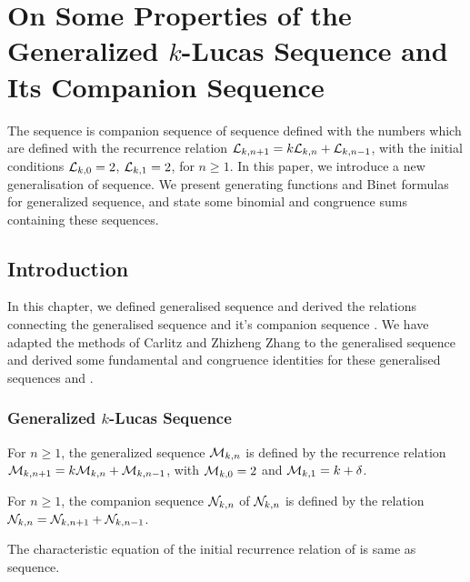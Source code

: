 %
%
\let\textcircled=\pgftextcircled
\chapter{On Some Properties of the Generalized $k$-Lucas Sequence and Its Companion Sequence}
\label{chap:ON SOME NEW IDENTITIES CONCERNING THE GENERALIZED}
The \kL\vspace{.5mm} sequence is companion sequence of \kF\vspace{.5mm} sequence defined with the \kL\vspace{.5mm} numbers which are defined with the recurrence relation $\mathcal{L}_{k,n+1} = k \mathcal{L}_{k,n}+\mathcal{L}_{k, n-1}$, with the initial conditions $\mathcal{L}_{k,0} = 2$, $\mathcal{L}_{k,1} = 2$,  for $n\geq{1}$. In this paper, we introduce a new generalisation \M\vspace{.5mm}  of \kL\vspace{.5mm} sequence. We present generating functions and Binet formulas for generalized \kL\vspace{.5mm} sequence, and state some binomial and congruence sums containing these sequences.
\section{Introduction}
\label{sec:introduction}
In this chapter, we defined generalised \kL\vspace{.5mm} sequence \M and derived the relations connecting the generalised \kL\vspace{.5mm} sequence \M and it's companion sequence \N. We have adapted the methods of Carlitz  \cite{2} and Zhizheng Zhang \cite{3} to the generalised \kL\vspace{.5mm} sequence \M
and derived some fundamental and congruence identities for these generalised \kL\vspace{.5mm} sequences \M and \N .
\subsection*{{Generalized $k$-Lucas Sequence \M}}
\begin{definition}\label{1}
For $n\geq{1}$, the generalized \kL\vspace{.5mm} sequence $\mathcal{M}_{k,n}$ is defined by the recurrence relation 
$\mathcal{M}_{k,n+1}=k\mathcal{M}_{k,n}+\mathcal{M}_{k,n-1}$, with $\mathcal{M}_{k,0}=2$ and $ \mathcal{M}_{k,1}=k+\delta$.
\end{definition}
\begin{definition}
For $n\geq{1}$, the companion sequence $\mathcal{N}_{k,n}$ of $\mathcal{N}_{k,n}$ is defined by the relation $\mathcal{N}_{k,n}=\mathcal{N}_{k,n+1}+\mathcal{N}_{k,n-1}$.
\end{definition}
\noindent The characteristic equation of the initial recurrence relation of \M is same as \kL\vspace{.5mm} sequence.

